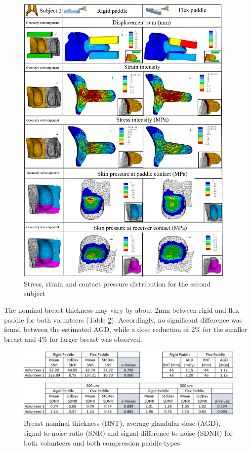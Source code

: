 \begin{figure}[!h]
\centering
\includegraphics[width=0.95\textwidth,keepaspectratio]{figures/subject2_compressionResults.png} 
\caption{Stress, strain and contact pressure distribution for the second subject}\label{fig:subject2_compressionResults}
\end{figure}

The nominal breast thickness may vary by about 2mm between rigid and flex paddle for both volunteers (Table \ref{fig:table_compression_results}). Accordingly, no significant difference was found between the estimated AGD, while a dose reduction of 2\% for the smaller breast and 4\% for larger breast was observed.

\begin{figure}[!h]
\centering
\includegraphics[width=\textwidth,keepaspectratio]{figures/table_compression_results.png} 
\caption{Breast nominal thickness (BNT), average glandular dose (AGD), signal-to-noise-ratio (SNR) and signal-difference-to-noise (SDNR) for both volunteers and both compression paddle types}\label{fig:table_compression_results}
\end{figure}

